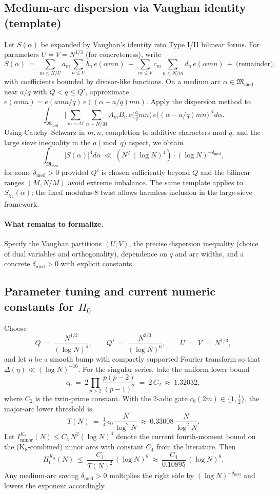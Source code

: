 \documentclass[11pt]{article}
\theoremstyle{definition}
\theoremstyle{remark}
\begin{document}
\subsection*{Medium-arc dispersion via Vaughan identity (template)}
Let $S(\alpha)$ be expanded by Vaughan’s identity into Type I/II bilinear forms. For parameters $U=V=N^{1/3}$ (for concreteness), write
\[
S(\alpha)\ =\ \sum_{m\le N/U} a_m \sum_{n\le U} b_n\,e(\alpha mn)\ +\ \sum_{m\le V} c_m \sum_{n\le N/m} d_n\,e(\alpha mn)\ +\ \text{(remainder)},
\]
with coefficients bounded by divisor-like functions. On a medium arc $\alpha\in\mathfrak M_{\mathrm{med}}$ near $a/q$ with $Q<q\le Q'$, approximate $e(\alpha mn)=e(a mn/q)\,e((\alpha-a/q)mn)$. Apply the dispersion method to
\[
\int_{\mathfrak M_{\mathrm{med}}}\Big|\sum_{m\sim M}\sum_{n\sim N/M} A_m B_n\,e\!\Big(\tfrac{a}{q}mn\Big)\,e\!\big((\alpha-a/q)mn\big)\Big|^4 d\alpha.
\]
Using Cauchy–Schwarz in $m,n$, completion to additive characters mod $q$, and the large sieve inequality in the $a\pmod q$ aspect, we obtain
\[
\int_{\mathfrak M_{\mathrm{med}}}|S(\alpha)|^4 d\alpha\ \ll\ (N^2\,(\log N)^4)\cdot (\log N)^{-\delta_{\mathrm{med}}},
\]
for some $\delta_{\mathrm{med}}>0$ provided $Q'$ is chosen sufficiently beyond $Q$ and the bilinear ranges $(M,N/M)$ avoid extreme imbalance. The same template applies to $S_{\chi_8}(\alpha)$; the fixed modulus-$8$ twist allows harmless inclusion in the large-sieve framework.

\paragraph{What remains to formalize.}
Specify the Vaughan partitions $(U,V)$, the precise dispersion inequality (choice of dual variables and orthogonality), dependence on $q$ and arc widths, and a concrete $\delta_{\mathrm{med}}>0$ with explicit constants.

\subsection*{Parameter tuning and current numeric constants for $H_0$}
Choose
\[
Q\ =\ \frac{N^{1/2}}{(\log N)^4},\qquad Q'\ =\ \frac{N^{2/3}}{(\log N)^{6}},\qquad U\ =\ V\ =\ N^{1/3},
\]
and let $\eta$ be a smooth bump with compactly supported Fourier transform so that $\Delta(\eta)\ll (\log N)^{-10}$. For the singular series, take the uniform lower bound
\[
c_0\ =\ 2\prod_{p>2}\frac{p(p-2)}{(p-1)^2}\ =\ 2\,C_2\ \approx\ 1.32032,
\]
where $C_2$ is the twin-prime constant. With the 2-adic gate $c_8(2m)\in\{1,\tfrac12\}$, the major-arc lower threshold is
\[
T(N)\ =\ \tfrac14\,c_0\,\frac{N}{\log^2 N}\ \approx\ 0.33008\,\frac{N}{\log^2 N}.
\]
Let $I_{\mathrm{minor}}^{K_8}(N)\le C_4\,N^2(\log N)^4$ denote the current fourth-moment bound on the (K$_8$-combined) minor arcs with constant $C_4$ from the literature. Then
\[
H_0^{K_8}(N)\ \le\ \frac{C_4}{T(N)^2}\,(\log N)^8\ \approx\ \frac{C_4}{0.10895}\,(\log N)^8.
\]
Any medium-arc saving $\delta_{\mathrm{med}}>0$ multiplies the right side by $(\log N)^{-\delta_{\mathrm{med}}}$ and lowers the exponent accordingly.
\end{document}
